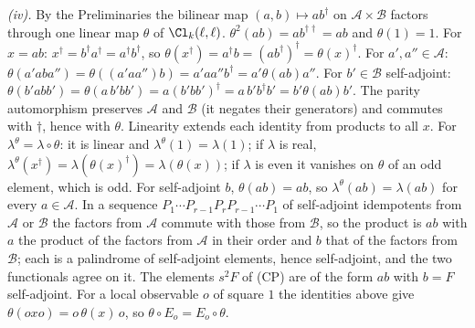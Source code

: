 \emph{(iv).} By the Preliminaries the bilinear map $(a, b) \mapsto ab^{\dagger}$ on $\mathcal{A} \times \mathcal{B}$ factors through one linear map $\theta$ of $\Cl_{k}(\ell,\ell)$. $\theta^{2}(ab) = ab^{\dagger\dagger} = ab$ and $\theta(1) = 1$. For $x = ab$: $x^{\dagger} = b^{\dagger}a^{\dagger} = a^{\dagger}b^{\dagger}$, so $\theta(x^{\dagger}) = a^{\dagger}b = (ab^{\dagger})^{\dagger} = \theta(x)^{\dagger}$. For $a', a'' \in \mathcal{A}$: $\theta(a'aba'') = \theta((a'aa'')b) = a'aa''b^{\dagger} = a'\theta(ab)a''$. For $b' \in \mathcal{B}$ self-adjoint: $\theta(b'abb') = \theta(a\,b'bb') = a(b'bb')^{\dagger} = a\,b'b^{\dagger}b' = b'\theta(ab)b'$. The parity automorphism preserves $\mathcal{A}$ and $\mathcal{B}$ (it negates their generators) and commutes with $\dagger$, hence with $\theta$. Linearity extends each identity from products to all $x$. For $\lambda^{\theta} = \lambda \circ \theta$: it is linear and $\lambda^{\theta}(1) = \lambda(1)$; if $\lambda$ is real, $\lambda^{\theta}(x^{\dagger}) = \lambda(\theta(x)^{\dagger}) = \lambda(\theta(x))$; if $\lambda$ is even it vanishes on $\theta$ of an odd element, which is odd. For self-adjoint $b$, $\theta(ab) = ab$, so $\lambda^{\theta}(ab) = \lambda(ab)$ for every $a \in \mathcal{A}$. In a sequence $P_{1}\cdots P_{r-1}P_{r}P_{r-1}\cdots P_{1}$ of self-adjoint idempotents from $\mathcal{A}$ or $\mathcal{B}$ the factors from $\mathcal{A}$ commute with those from $\mathcal{B}$, so the product is $ab$ with $a$ the product of the factors from $\mathcal{A}$ in their order and $b$ that of the factors from $\mathcal{B}$; each is a palindrome of self-adjoint elements, hence self-adjoint, and the two functionals agree on it. The elements $s^{2}F$ of (CP) are of the form $ab$ with $b = F$ self-adjoint. For a local observable $o$ of square $1$ the identities above give $\theta(oxo) = o\,\theta(x)\,o$, so $\theta \circ E_{o} = E_{o} \circ \theta$.

